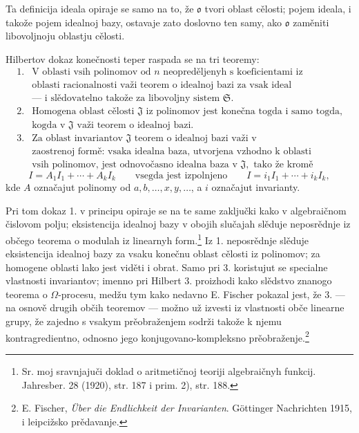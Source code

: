 \documentclass[11pt]{article}
\providecommand{\mJ}{\mathfrak J}
\providecommand{\mS}{\mathfrak S}
\providecommand{\mo}{\mathfrak o}
\begin{document}
Ta definicija ideala opiraje se samo na to, že $\mo$ tvori oblast cělosti; pojem ideala, i takože pojem idealnoj bazy, ostavaje zato doslovno ten samy, ako $\mo$ zaměniti libovoljnoju oblastju cělosti.

Hilbertov dokaz konečnosti teper raspada se na tri teoremy:
\[
\begin{array}{ll}
1.& \text{V oblasti vsih polinomov od }n\text{ neopreděljenyh s koeficientami iz}\\
& \text{oblasti racionalnosti važi teorem o idealnoj bazi za vsak ideal}\\
& \text{--- i slědovatelno takože za libovoljny sistem }\mS.\\[2pt]
2.& \text{Homogena oblast cělosti }\mJ\text{ iz polinomov jest konečna togda i samo togda,}\\
& \text{kogda v }\mJ\text{ važi teorem o idealnoj bazi.}\\[2pt]
3.& \text{Za oblast invariantov }\mJ\text{ teorem o idealnoj bazi važi v}\\
& \text{zaostrenoj formě: vsaka idealna baza, utvorjena vzhodno k oblasti}\\
& \text{vsih polinomov, jest odnovočasno idealna baza v }\mJ,\text{ tako že kromě}
\end{array}
\]
\[
 I=A_1I_1+\cdots+A_kI_k
 \qquad\text{vsegda jest izpolnjeno}\qquad
 I=i_1I_1+\cdots+i_kI_k,
\]
kde $A$ označajut polinomy od $a,b,\ldots,x,y,\ldots$, a $i$ označajut invarianty.

Pri tom dokaz 1. v principu opiraje se na te same zaključki kako v algebraičnom čislovom polju; eksistencija idealnoj bazy v obojih slučajah slěduje neposrědnje iz občego teorema o modulah iz linearnyh form.\footnote{Sr. moj sravnjajuči doklad o aritmetičnoj teoriji algebraičnyh funkcij. Jahresber. 28 (1920), str. 187 i prim. 2), str. 188.} Iz 1. neposrědnje slěduje eksistencija idealnoj bazy za vsaku konečnu oblast cělosti iz polinomov; za homogene oblasti lako jest viděti i obrat. Samo pri 3. koristujut se specialne vlastnosti invariantov; imenno pri Hilbert 3. proizhodi kako slědstvo znanogo teorema o $\Omega$-procesu, medžu tym kako nedavno E. Fischer pokazal jest, že 3. --- na osnově drugih občih teoremov --- možno už izvesti iz vlastnosti obče linearne grupy, že zajedno s vsakym prěobraženjem sodrži takože k njemu kontragredientno, odnosno jego konjugovano-kompleksno prěobraženje.\footnote{E. Fischer, \emph{Über die Endlichkeit der Invarianten}. Göttinger Nachrichten 1915, i leipcižsko prědavanje.}
\end{document}
